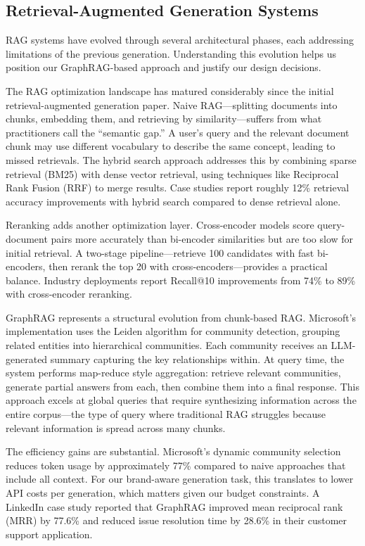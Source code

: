 \documentclass[11pt, twocolumn]{article}
\begin{document}
\subsection{Retrieval-Augmented Generation Systems}

RAG systems have evolved through several architectural phases, each addressing limitations of the previous generation. Understanding this evolution helps us position our GraphRAG-based approach and justify our design decisions.

The RAG optimization landscape has matured considerably since the initial retrieval-augmented generation paper. Naive RAG---splitting documents into chunks, embedding them, and retrieving by similarity---suffers from what practitioners call the ``semantic gap.'' A user's query and the relevant document chunk may use different vocabulary to describe the same concept, leading to missed retrievals. The hybrid search approach addresses this by combining sparse retrieval (BM25) with dense vector retrieval, using techniques like Reciprocal Rank Fusion (RRF) to merge results. Case studies report roughly 12\% retrieval accuracy improvements with hybrid search compared to dense retrieval alone.

Reranking adds another optimization layer. Cross-encoder models score query-document pairs more accurately than bi-encoder similarities but are too slow for initial retrieval. A two-stage pipeline---retrieve 100 candidates with fast bi-encoders, then rerank the top 20 with cross-encoders---provides a practical balance. Industry deployments report Recall@10 improvements from 74\% to 89\% with cross-encoder reranking.

GraphRAG represents a structural evolution from chunk-based RAG. Microsoft's implementation uses the Leiden algorithm for community detection, grouping related entities into hierarchical communities. Each community receives an LLM-generated summary capturing the key relationships within. At query time, the system performs map-reduce style aggregation: retrieve relevant communities, generate partial answers from each, then combine them into a final response. This approach excels at global queries that require synthesizing information across the entire corpus---the type of query where traditional RAG struggles because relevant information is spread across many chunks.

The efficiency gains are substantial. Microsoft's dynamic community selection reduces token usage by approximately 77\% compared to naive approaches that include all context. For our brand-aware generation task, this translates to lower API costs per generation, which matters given our budget constraints. A LinkedIn case study reported that GraphRAG improved mean reciprocal rank (MRR) by 77.6\% and reduced issue resolution time by 28.6\% in their customer support application.
\end{document}
